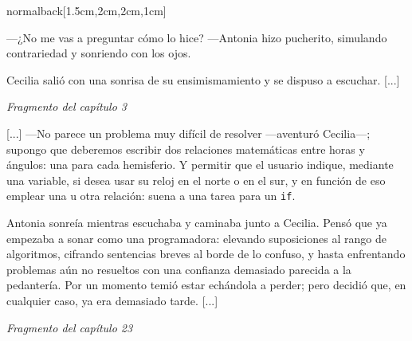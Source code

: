 \documentclass[coverheight=210mm,coverwidth=148.5mm, bleedwidth=23mm, %
spinewidth=23mm, foldingmargin, marklength=4mm, 11pt]{bookcover}
\begin{document}
\begin{bookcover}
\begin{bookcoverelement}{normal}{back}[1.5cm,2cm,2cm,1cm]
{      \hspace{.5em} ---¿No me vas a preguntar cómo lo hice? ---Antonia
      hizo pucherito, simulando contrariedad y sonriendo con los ojos.

      \hspace{.5em} Cecilia salió con una sonrisa de su
      ensimismamiento y se dispuso a escuchar. [...]
  

  \begin{flushright}
    \emph{Fragmento del capítulo 3}
  \end{flushright}

  \vspace{2.5em}
  
  \hspace{.5em} [...] ---No parece un problema muy difícil de resolver
  ---a\-ven\-tu\-ró Cecilia---; supongo que deberemos escribir dos
  relaciones matemáticas entre horas y ángulos: una para cada
  hemisferio. Y permitir que el usuario indique, mediante una
  variable, si desea usar su reloj en el norte o en el sur, y en
  función de eso emplear una u otra relación: suena a una tarea para
  un \texttt{if}.

  \hspace{.5em} Antonia sonreía mientras escuchaba y caminaba junto a
  Cecilia. Pensó que ya empezaba a sonar como una programadora:
  elevando suposiciones al rango de algoritmos, cifrando sentencias
  breves al borde de lo confuso, y hasta enfrentando problemas aún no
  resueltos con una confianza demasiado parecida a la pedantería. Por
  un momento temió estar echándola a perder; pero decidió que, en
  cualquier caso, ya era demasiado tarde. [...]

  \begin{flushright}
    \emph{Fragmento del capítulo 23}
  \end{flushright}
}
  
  \end{bookcoverelement}


\end{bookcover}
\end{document}

